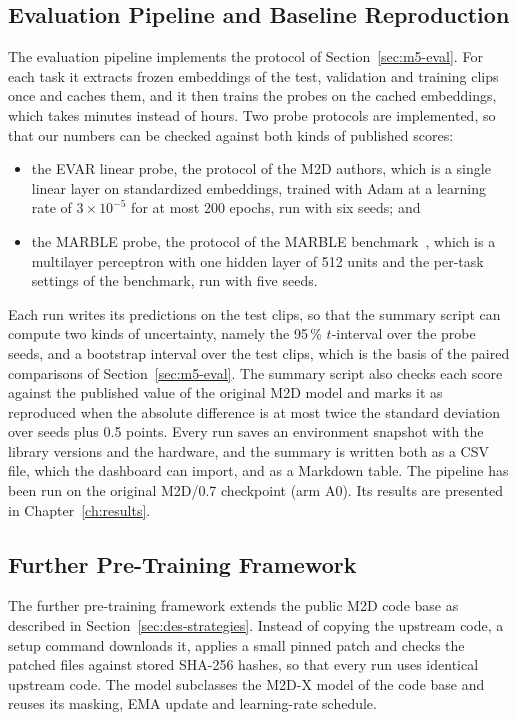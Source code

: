 \subsection{Evaluation Pipeline and Baseline Reproduction}
\label{sec:impl-eval}
The evaluation pipeline implements the protocol of Section~\ref{sec:m5-eval}. For each task it extracts frozen embeddings of the test, validation and training clips once and caches them, and it then trains the probes on the cached embeddings, which takes minutes instead of hours. Two probe protocols are implemented, so that our numbers can be checked against both kinds of published scores:
\begin{itemize}
  \item the EVAR linear probe, the protocol of the M2D authors, which is a single linear layer on standardized embeddings, trained with Adam at a learning rate of $3\times10^{-5}$ for at most 200 epochs, run with six seeds; and
  \item the MARBLE probe, the protocol of the MARBLE benchmark~\cite{ref:Yuan:2023marble}, which is a multilayer perceptron with one hidden layer of 512 units and the per-task settings of the benchmark, run with five seeds.
\end{itemize}
Each run writes its predictions on the test clips, so that the summary script can compute two kinds of uncertainty, namely the 95\,\% $t$-interval over the probe seeds, and a bootstrap interval over the test clips, which is the basis of the paired comparisons of Section~\ref{sec:m5-eval}. The summary script also checks each score against the published value of the original M2D model and marks it as reproduced when the absolute difference is at most twice the standard deviation over seeds plus 0.5 points. Every run saves an environment snapshot with the library versions and the hardware, and the summary is written both as a CSV file, which the dashboard can import, and as a Markdown table. The pipeline has been run on the original M2D/0.7 checkpoint (arm A0). Its results are presented in Chapter~\ref{ch:results}.

\subsection{Further Pre-Training Framework}
\label{sec:impl-train}
The further pre-training framework extends the public M2D code base as described in Section~\ref{sec:des-strategies}. Instead of copying the upstream code, a setup command downloads it, applies a small pinned patch and checks the patched files against stored SHA-256 hashes, so that every run uses identical upstream code. The model subclasses the M2D-X model of the code base and reuses its masking, EMA update and learning-rate schedule.


